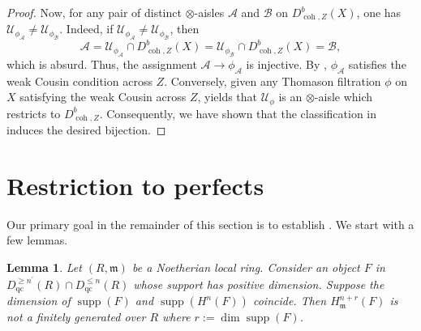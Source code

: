 \documentclass[11pt]{amsart}
\theoremstyle{plain}
\newtheorem{lemma}[theorem]{Lemma}
\theoremstyle{definition}
\numberwithin{equation}{section}
\numberwithin{theorem}{section}
\begin{document}
\begin{proof}
    Now, for any pair of distinct $\otimes$-aisles $\mathcal{A}$ and $\mathcal{B}$ on $D^b_{\operatorname{coh},Z}(X)$, one has $\mathcal{U}_{\phi_{\mathcal{A}}} \not= \mathcal{U}_{\phi_{\mathcal{B}}}$. Indeed, if $\mathcal{U}_{\phi_{\mathcal{A}}} \not= \mathcal{U}_{\phi_{\mathcal{B}}}$, then 
    \begin{displaymath}
        \mathcal{A} = \mathcal{U}_{\phi_{\mathcal{A}}} \cap D^b_{\operatorname{coh},Z}(X) = \mathcal{U}_{\phi_{\mathcal{B}}} \cap D^b_{\operatorname{coh},Z}(X) = \mathcal{B},
    \end{displaymath}
    which is absurd. Thus, the assignment $\mathcal{A} \to \phi_{\mathcal{A}}$ is injective. By , $\phi_{\mathcal{A}}$ satisfies the weak Cousin condition across $Z$. Conversely, given any Thomason filtration $\phi$ on $X$ satisfying the weak Cousin across $Z$,  yields that $\mathcal{U}_\phi$ is an $\otimes$-aisle which restricts to $D^b_{\operatorname{coh},Z}$. Consequently, we have shown that the classification in  induces the desired bijection.
\end{proof}

\section{Restriction to perfects}
\label{sec:results2}

Our primary goal in the remainder of this section is to establish . We start with a few lemmas. 

\begin{lemma}\label{lem:A2}
    Let $(R,\mathfrak{m})$ be a Noetherian local ring. Consider an object $F$ in $D_{\operatorname{qc}}^{\geq n^\prime}(R) \cap D_{\operatorname{qc}}^{\leq n}(R)$ whose support has positive dimension. Suppose the dimension of $\operatorname{supp}(F)$ and $\operatorname{supp}(H^n(F))$ coincide. Then $H^{n+r}_{\mathfrak{m}}(F)$ is not a finitely generated over $R$ where $r:= \operatorname{dim}\operatorname{supp}(F)$.
\end{lemma}
\end{document}
